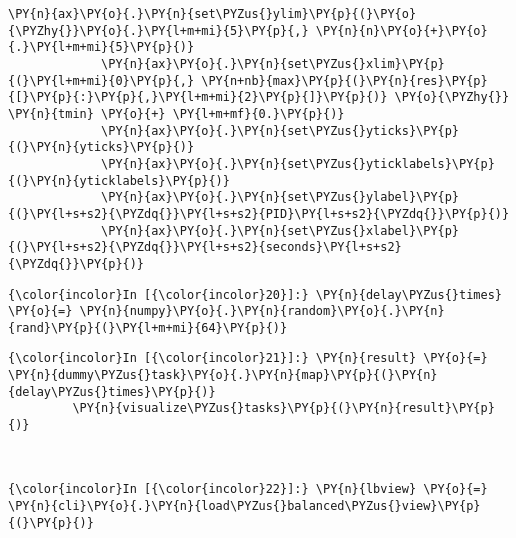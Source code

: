 \begin{Verbatim}[commandchars=\\\{\}]
             \PY{n}{ax}\PY{o}{.}\PY{n}{set\PYZus{}ylim}\PY{p}{(}\PY{o}{\PYZhy{}}\PY{o}{.}\PY{l+m+mi}{5}\PY{p}{,} \PY{n}{n}\PY{o}{+}\PY{o}{.}\PY{l+m+mi}{5}\PY{p}{)}
             \PY{n}{ax}\PY{o}{.}\PY{n}{set\PYZus{}xlim}\PY{p}{(}\PY{l+m+mi}{0}\PY{p}{,} \PY{n+nb}{max}\PY{p}{(}\PY{n}{res}\PY{p}{[}\PY{p}{:}\PY{p}{,}\PY{l+m+mi}{2}\PY{p}{]}\PY{p}{)} \PY{o}{\PYZhy{}} \PY{n}{tmin} \PY{o}{+} \PY{l+m+mf}{0.}\PY{p}{)}
             \PY{n}{ax}\PY{o}{.}\PY{n}{set\PYZus{}yticks}\PY{p}{(}\PY{n}{yticks}\PY{p}{)}
             \PY{n}{ax}\PY{o}{.}\PY{n}{set\PYZus{}yticklabels}\PY{p}{(}\PY{n}{yticklabels}\PY{p}{)}
             \PY{n}{ax}\PY{o}{.}\PY{n}{set\PYZus{}ylabel}\PY{p}{(}\PY{l+s+s2}{\PYZdq{}}\PY{l+s+s2}{PID}\PY{l+s+s2}{\PYZdq{}}\PY{p}{)}
             \PY{n}{ax}\PY{o}{.}\PY{n}{set\PYZus{}xlabel}\PY{p}{(}\PY{l+s+s2}{\PYZdq{}}\PY{l+s+s2}{seconds}\PY{l+s+s2}{\PYZdq{}}\PY{p}{)}
\end{Verbatim}

    \begin{Verbatim}[commandchars=\\\{\}]
{\color{incolor}In [{\color{incolor}20}]:} \PY{n}{delay\PYZus{}times} \PY{o}{=} \PY{n}{numpy}\PY{o}{.}\PY{n}{random}\PY{o}{.}\PY{n}{rand}\PY{p}{(}\PY{l+m+mi}{64}\PY{p}{)}
\end{Verbatim}

    \begin{Verbatim}[commandchars=\\\{\}]
{\color{incolor}In [{\color{incolor}21}]:} \PY{n}{result} \PY{o}{=} \PY{n}{dummy\PYZus{}task}\PY{o}{.}\PY{n}{map}\PY{p}{(}\PY{n}{delay\PYZus{}times}\PY{p}{)}
         \PY{n}{visualize\PYZus{}tasks}\PY{p}{(}\PY{n}{result}\PY{p}{)}
\end{Verbatim}
\begin{center}
    \end{center}
    { \hspace*{\fill} \\}


    \begin{Verbatim}[commandchars=\\\{\}]
{\color{incolor}In [{\color{incolor}22}]:} \PY{n}{lbview} \PY{o}{=} \PY{n}{cli}\PY{o}{.}\PY{n}{load\PYZus{}balanced\PYZus{}view}\PY{p}{(}\PY{p}{)}
\end{Verbatim}

